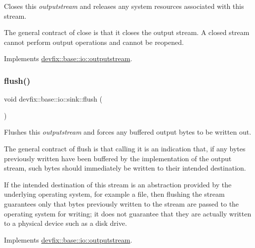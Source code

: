 Closes this {\itshape outputstream} and releases any system resources associated with this stream. 

The general contract of close is that it closes the output stream. A closed stream cannot perform output operations and cannot be reopened. 

Implements \hyperlink{structdevfix_1_1base_1_1io_1_1outputstream_a060c2e7040e6bb831b8150f64bd8abf7}{devfix\+::base\+::io\+::outputstream}.

\mbox{\label{structdevfix_1_1base_1_1io_1_1sink_abf208747c9be8295972fbc4696ddc557}} 
\subsubsection{\texorpdfstring{flush()}{flush()}}
{\footnotesize\ttfamily void devfix\+::base\+::io\+::sink\+::flush (\begin{DoxyParamCaption}{ }\end{DoxyParamCaption})\hspace{0.3cm}{\ttfamily [virtual]}}



Flushes this {\itshape outputstream} and forces any buffered output bytes to be written out. 

The general contract of flush is that calling it is an indication that, if any bytes previously written have been buffered by the implementation of the output stream, such bytes should immediately be written to their intended destination.

If the intended destination of this stream is an abstraction provided by the underlying operating system, for example a file, then flushing the stream guarantees only that bytes previously written to the stream are passed to the operating system for writing; it does not guarantee that they are actually written to a physical device such as a disk drive. 

Implements \hyperlink{structdevfix_1_1base_1_1io_1_1outputstream_a3fe3b34675a2d70331e6ca235388e0cc}{devfix\+::base\+::io\+::outputstream}.

\mbox{\label{structdevfix_1_1base_1_1io_1_1sink_a1e5782219f9256d8ff09385fa6f3b156}} 
